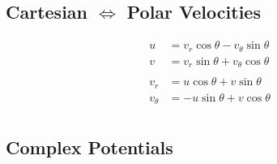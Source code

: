\documentclass[10pt, letterpaper, notitlepage, landscape]{article}
\begin{document}
\subsection{Cartesian $\Leftrightarrow$ Polar Velocities}
\begin{align*}
u &= v_r \cos{\theta} - v_{\theta} \sin{\theta} \\
v &= v_r \sin{\theta} + v_{\theta} \cos{\theta} \\ \\
v_r &= u \cos{\theta} + v \sin{\theta} \\
v_{\theta} &= -u \sin{\theta} + v \cos{\theta} \\
\end{align*}

\subsection{Complex Potentials}
\end{document}
